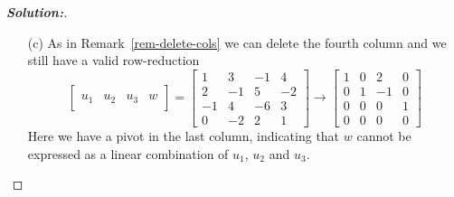 \documentclass[a4paper]{amsart}
\theoremstyle{definition}
\newenvironment{solution}{\begin{proof}[\textbf{Solution:}] \vphantom{u}}{\end{proof}}
\begin{document}
\begin{solution}
\begin{itemize}
   column and we still have a valid row-reduction
   \[
     \left[\begin{array}{c|c|c|c}
      &&&\\u_1&u_2&u_3&v\\ &&&
     \end{array}\right]
     =
     \left[\begin{array}{cccc}
      1&3&-1&5\\2&-1&5&-4\\-1&4&-6&9\\0&-2&2&-4
     \end{array}\right]\\
     \to
     \left[\begin{array}{cccc}
      1&0&2&-1\\0&1&-1&2\\0&0&0&0\\0&0&0&0
     \end{array}\right]
   \]
   The matrix on the right is in RREF with no pivot in the last
   column, which means (by Method~\ref{meth-find-lincomb}) that $v$ is
   indeed a linear combination of $u_1,u_2$ and $u_3$.  More
   specifically, we see that the equation
   $\lm_1u_1+\lm_2u_2+\lm_3u_3=v$ is equivalent to the system of
   equations corresponding to the above matrix, namely
   \begin{align*}
    \lm_1 + 2\lm_3 &= -1 \\
    \lm_2-\lm_3 &= 2 \\
    0 &= 0 \\
    0 &= 0.
   \end{align*}
   The solution is $\lm_1=-1-2\lm_3$ and $\lm_2=2+\lm_3$ with $\lm_3$
   arbitrary.  We can take $\lm_3=0$ giving $\lm_1=-1$ and $\lm_2=2$,
   which means that $v=-u_1+2u_2$.
  \item[(c)] As in Remark~\ref{rem-delete-cols} we can delete the fourth
   column and we still have a valid row-reduction
   \[
     \left[\begin{array}{c|c|c|c}
      &&& \\ u_1&u_2&u_3&w \\ &&&
     \end{array}\right]
     =
     \left[\begin{array}{cccc}
      1&3&-1&4\\2&-1&5&-2\\-1&4&-6&3\\0&-2&2&1
     \end{array}\right]
     \to
     \left[\begin{array}{cccc}
      1&0&2&0\\0&1&-1&0\\0&0&0&1\\0&0&0&0
     \end{array}\right]
   \]
   Here we have a pivot in the last column, indicating that $w$ cannot
   be expressed as a linear combination of $u_1$, $u_2$ and $u_3$.
 \end{itemize}
\end{solution}
\end{document}

